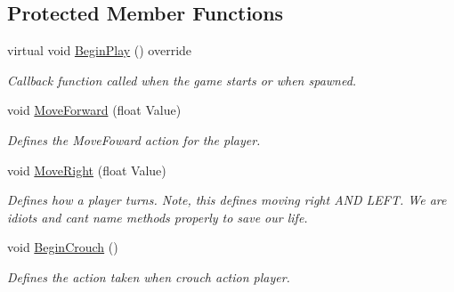 \subsection*{Protected Member Functions}
\begin{DoxyCompactItemize}
\item 
\mbox{\label{class_a_main_character_a096ef46022cd84777b571482729ed02f}} 
virtual void \mbox{\hyperlink{class_a_main_character_a096ef46022cd84777b571482729ed02f}{Begin\+Play}} () override
\begin{DoxyCompactList}\small\item\em Callback function called when the game starts or when spawned. \end{DoxyCompactList}\item 
\mbox{\label{class_a_main_character_aa85b946058cdc5f9b68ce529c9c680d8}} 
void \mbox{\hyperlink{class_a_main_character_aa85b946058cdc5f9b68ce529c9c680d8}{Move\+Forward}} (float Value)
\begin{DoxyCompactList}\small\item\em Defines the Move\+Foward action for the player. \end{DoxyCompactList}\item 
\mbox{\label{class_a_main_character_aa3b2268816c54828d166ea626fdde411}} 
void \mbox{\hyperlink{class_a_main_character_aa3b2268816c54828d166ea626fdde411}{Move\+Right}} (float Value)
\begin{DoxyCompactList}\small\item\em Defines how a player turns. Note, this defines moving right A\+ND L\+E\+FT. We are idiots and can\textquotesingle{}t name methods properly to save our life. \end{DoxyCompactList}\item 
\mbox{\label{class_a_main_character_a44625f8c76490dfa989dc046b0612e07}} 
void \mbox{\hyperlink{class_a_main_character_a44625f8c76490dfa989dc046b0612e07}{Begin\+Crouch}} ()
\begin{DoxyCompactList}\small\item\em Defines the action taken when crouch action player. \end{DoxyCompactList}\item 
\mbox{\label{class_a_main_character_a633a5955e941f4ff343709eed9141154}} 

\end{DoxyCompactItemize}
